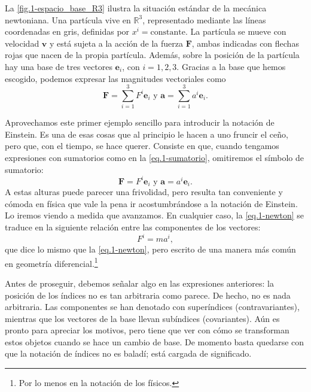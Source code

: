 La \cref{fig.1-espacio_base_R3} ilustra la situación estándar de la mecánica newtoniana. Una partícula vive en \(\mathbb{R}^3\), representado mediante las líneas coordenadas en gris, definidas por \(x^i=\text{constante}\). La partícula se mueve con velocidad \(\mathbf{v}\) y está sujeta a la acción de la fuerza \(\mathbf{F}\), ambas indicadas con flechas rojas que nacen de la propia partícula. Además, sobre la posición de la partícula hay una base de tres vectores \(\mathbf{e}_i\), con \(i=1, 2, 3\). Gracias a la base que hemos escogido, podemos expresar las magnitudes vectoriales como
\begin{equation}
    \label{eq.1-sumatorio}
    \mathbf{F} = \sum_{i=1}^3 F^i \mathbf{e}_i \text{  y  } \mathbf{a} = \sum_{i=1}^3 a^i \mathbf{e}_i.
\end{equation}

Aprovechamos este primer ejemplo sencillo para introducir la notación de Einstein. Es una de esas cosas que al principio le hacen a uno fruncir el ceño, pero que, con el tiempo, se hace querer. Consiste en que, cuando tengamos expresiones con sumatorios como en la \cref{eq.1-sumatorio}, omitiremos el símbolo de sumatorio:
\begin{equation}
    \label{eq.1-einstein}
    \mathbf{F} = F^i \mathbf{e}_i \text{  y  } \mathbf{a} = a^i \mathbf{e}_i.
\end{equation}
A estas alturas puede parecer una frivolidad, pero resulta tan conveniente y cómoda en física que vale la pena ir acostumbrándose a la notación de Einstein. Lo iremos viendo a medida que avanzamos. En cualquier caso, la \cref{eq.1-newton} se traduce en la siguiente relación entre las componentes de los vectores:
\begin{equation}
    F^i = m a^i,
\end{equation}
que dice lo mismo que la \cref{eq.1-newton}, pero escrito de una manera más común en geometría diferencial.\footnote{Por lo menos en la notación de los físicos.}

Antes de proseguir, debemos señalar algo en las expresiones anteriores: la posición de los índices no es tan arbitraria como parece. De hecho, no es nada arbitraria. Las componentes se han denotado con superíndices (contravariantes), mientras que los vectores de la base llevan subíndices (covariantes). Aún es pronto para apreciar los motivos, pero tiene que ver con cómo se transforman estos objetos cuando se hace un cambio de base. De momento basta quedarse con que la notación de índices no es baladí; está cargada de significado.

